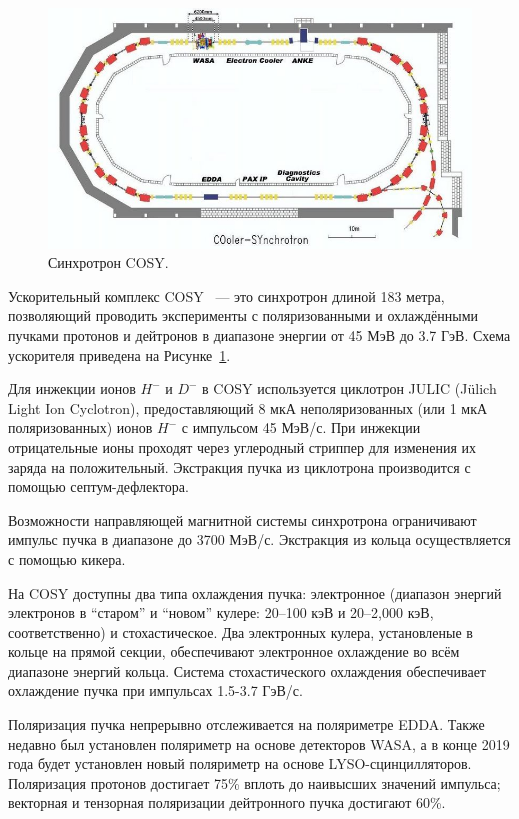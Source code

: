 
\begin{figure}[h]
	\centering
	\includegraphics[scale=.5]{images/chapter4/800px-COSY_Ring}
	\caption{Синхротрон COSY.\label{fig:COSY_Ring}}
\end{figure}

Ускорительный комплекс COSY~\cite{COSY-Ring} --- это синхротрон длиной 183 метра, позволяющий проводить эксперименты с поляризованными и охлаждёнными пучками протонов и дейтронов в диапазоне энергии от 45 МэВ до 3.7 ГэВ. Схема ускорителя приведена на Рисунке~\ref{fig:COSY_Ring}.

Для инжекции ионов $H^-$ и $D^-$ в COSY  используется циклотрон JULIC (J\"ulich Light Ion Cyclotron), предоставляющий 8 мкА неполяризованных (или 1 мкА поляризованных) ионов $H^-$ с импульсом 45 МэВ/с. При инжекции отрицательные ионы проходят через углеродный стриппер для изменения их заряда на положительный. Экстракция пучка из циклотрона производится с помощью септум-дефлектора.~\cite{JULIC-Injector}

Возможности направляющей магнитной системы синхротрона ограничивают импульс пучка в диапазоне до 3700 МэВ/с. Экстракция из кольца осуществляется с помощью кикера.

На COSY доступны два типа охлаждения пучка: электронное (диапазон энергий электронов в ``старом'' и ``новом'' кулере: 20--100 кэВ и 20--2,000 кэВ, соответственно) и стохастическое. 
%
Два электронных кулера, установленые в кольце на прямой секции, обеспечивают электронное охлаждение во всём диапазоне энергий кольца. Система стохастического охлаждения обеспечивает охлаждение пучка при импульсах 1.5-3.7 ГэВ/с.

Поляризация пучка непрерывно отслеживается на поляриметре  EDDA. Также недавно был установлен поляриметр на основе детекторов WASA, а в конце 2019 года будет установлен новый поляриметр на основе LYSO-сцинцилляторов.
Поляризация протонов достигает 75\% вплоть до наивысших значений импульса; векторная и тензорная поляризации дейтронного пучка достигают 60\%.~\cite[\textbf{Historical background}]{YellowReport}